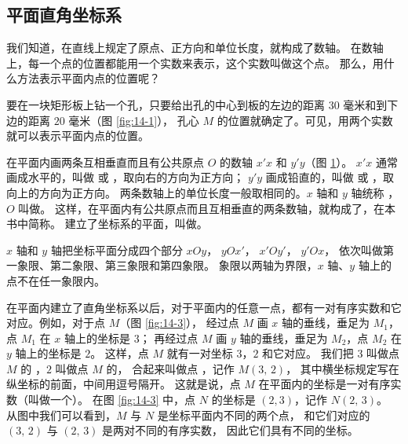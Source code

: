 \subsection{平面直角坐标系}\label{subsec:14-1}

我们知道，在直线上规定了原点、正方向和单位长度，就构成了数轴。
在数轴上，每一个点的位置都能用一个实数来表示，这个实数叫做这个点。
那么，用什么方法表示平面内点的位置呢？

要在一块矩形板上钻一个孔，只要给出孔的中心到板的左边的距离 $30$ 毫米和到下边的距离 $20$ 毫米（图 \ref{fig:14-1}），
孔心 $M$ 的位置就确定了。可见，用两个实数就可以表示平面内点的位置。

\begin{figure}[htbp]
    \centering
    \begin{minipage}{6cm}
    \centering
    
    \caption{}\label{fig:14-1}
    \end{minipage}
    \qquad
    \begin{minipage}{8cm}
    \centering
    
    \caption{}\label{fig:14-2}
    \end{minipage}
\end{figure}

在平面内画两条互相垂直而且有公共原点 $O$ 的数轴 $x'x$ 和 $y'y$（图 \ref{fig:14-2}）。
$x'x$ 通常画成水平的，叫做  或 ，取向右的方向为正方向；
$y'y$     画成铅直的，叫做  或 ，取向上的方向为正方向。
两条数轴上的单位长度一般取相同的。$x$ 轴和 $y$ 轴统称 ，$O$ 叫做。
这样，在平面内有公共原点而且互相垂直的两条数轴，就构成了，在本书中简称。
建立了坐标系的平面，叫做。

$x$ 轴和 $y$ 轴把坐标平面分成四个部分 $xOy$， $yOx'$， $x'Oy'$， $y'Ox$，
依次叫做第一象限、第二象限、第三象限和第四象限。
象限以两轴为界限，$x$ 轴、$y$ 轴上的点不在任一象限内。

在平面内建立了直角坐标系以后，对于平面内的任意一点，都有一对有序实数和它对应。例如，对于点 $M$（图 \ref{fig:14-3}），
  经过点 $M$ 画 $x$ 轴的垂线，垂足为 $M_1$，点 $M_1$ 在 $x$ 轴上的坐标是 $3$；
再经过点 $M$ 画 $y$ 轴的垂线，垂足为 $M_2$，点 $M_2$ 在 $y$ 轴上的坐标是 $2$。
这样，点 $M$ 就有一对坐标 $3$，$2$ 和它对应。
我们把 $3$ 叫做点 $M$ 的 ，$2$ 叫做点 $M$ 的，
合起来叫做点 ，记作 $M(3,\, 2)$，
其中横坐标规定写在纵坐标的前面，中间用逗号隔开。
这就是说，点 $M$ 在平面内的坐标是一对有序实数（叫做一个）。
在图 \ref{fig:14-3} 中，点 $N$ 的坐标是 $(2, 3)$，记作 $N (2,\, 3)$。
从图中我们可以看到，$M$ 与 $N$ 是坐标平面内不同的两个点，
和它们对应的 $(3,\, 2)$ 与 $(2,\, 3)$ 是两对不同的有序实数，
因此它们具有不同的坐标。

